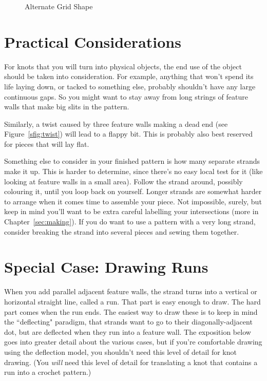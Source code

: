 \documentclass[openany]{book}
\begin{document}
\begin{figure}[H]
\centering
{}
\caption{Alternate Grid Shape}\label{fig:rectilinear}
\end{figure}

\section{Practical Considerations}
For knots that you will turn into physical objects, the end use of the object should be taken into consideration. For example, anything that won't spend its life laying down, or tacked to something else, probably shouldn't have any large continuous gaps. So you might want to stay away from long strings of feature walls that make big slits in the pattern.

Similarly, a twist caused by three feature walls making a dead end (see Figure~\ref{sfig:twist}) will lead to a flappy bit. This is probably also best reserved for pieces that will lay flat.

Something else to consider in your finished pattern is how many separate strands make it up. This is harder to determine, since there's no easy local test for it (like looking at feature walls in a small area). Follow the strand around, possibly colouring it, until you loop back on yourself. Longer strands are somewhat harder to arrange when it comes time to assemble your piece. Not impossible, surely, but keep in mind you'll want to be extra careful labelling your intersections (more in Chapter~\ref{sec:making}). If you do want to use a pattern with a very long strand, consider breaking the strand into several pieces and sewing them together.


\section{Special Case: Drawing Runs}\label{ssec:drawruns}
When you add parallel adjacent feature walls, the strand turns into a vertical or horizontal straight line, called a run. That part is easy enough to draw. The hard part comes when the run ends. The easiest way to draw these is to keep in mind the ``deflecting" paradigm, that strands want to go to their diagonally-adjacent dot, but are deflected when they run into a feature wall. The exposition below goes into greater detail about the various cases, but if you're comfortable drawing using the deflection model, you shouldn't need this level of detail for knot drawing. (You \emph{will} need this level of detail for translating a knot that contains a run into a crochet pattern.)
\end{document}
